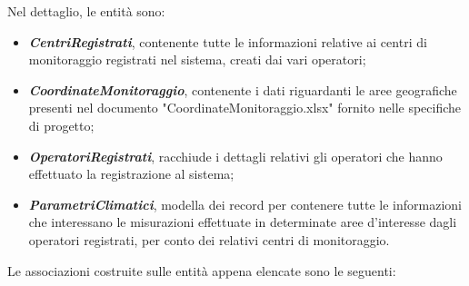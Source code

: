 	Nel dettaglio, le entità sono:
	\begin{itemize}
		\item \textbf{\textit{CentriRegistrati}}, contenente tutte le informazioni relative ai centri di monitoraggio registrati nel sistema, creati dai vari operatori;
		\item \textbf{\textit{CoordinateMonitoraggio}}, contenente i dati riguardanti le aree geografiche presenti nel documento "CoordinateMonitoraggio.xlsx" fornito nelle specifiche di progetto;
		\item \textbf{\textit{OperatoriRegistrati}}, racchiude i dettagli relativi gli operatori che hanno effettuato la registrazione al sistema;
		\item \textbf{\textit{ParametriClimatici}}, modella dei record per contenere tutte le informazioni che interessano le misurazioni effettuate in determinate aree d'interesse dagli operatori registrati, per conto dei relativi centri di monitoraggio.
	\end{itemize}
	\pagebreak
	Le associazioni costruite sulle entità appena elencate sono le seguenti:
